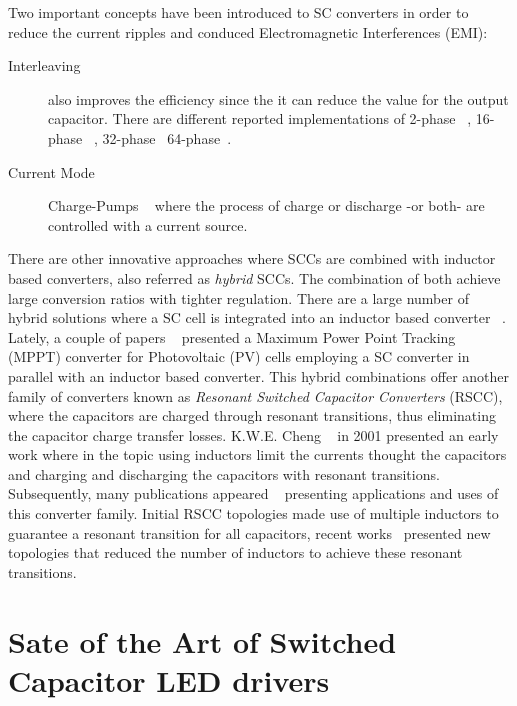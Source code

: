 Two important concepts have been introduced to SC converters in order to reduce the current ripples and conduced Electromagnetic Interferences (EMI):
\begin{description}
  \item[Interleaving] also improves the efficiency since the it can reduce the value for the output capacitor. There are different reported implementations of 2-phase ~\cite{07Chang,99Chung}, 16-phase ~\cite{09Breussegem,14Andersen}, 32-phase~\cite{10Le} 64-phase~\cite{15Andersen}.
  \item[Current Mode] Charge-Pumps ~\cite{96Zhu,09Das} where the process of charge or discharge -or both- are controlled with a current source.
\end{description}

There are other innovative approaches where SCCs are combined with inductor based converters, also referred as \emph{hybrid} SCCs. The combination of both achieve large conversion ratios with tighter regulation. There are a large number of hybrid solutions where a SC cell is integrated into an inductor based converter ~\cite{05Axelrod,08Axelrod, 11Mayo,11Miranda,12Kline}. Lately, a couple of papers ~\cite{12Zhigang,11Dazhong} presented a Maximum Power Point Tracking (MPPT) converter for Photovoltaic (PV) cells employing a SC converter in parallel with an inductor based converter. This hybrid combinations offer another family of converters known as \emph{Resonant Switched Capacitor Converters} (RSCC), where the capacitors are charged through resonant transitions, thus eliminating the capacitor charge transfer losses.  K.W.E. Cheng ~\cite{01Cheng} in 2001 presented an early  work where in the topic using inductors limit the currents thought the capacitors and charging and discharging the capacitors with resonant transitions.  Subsequently, many publications appeared ~\cite{05Lee,10Cao,11Gebben,07Shoyama} presenting applications and uses of this converter family. Initial RSCC topologies made use of multiple inductors to guarantee a resonant transition for all capacitors, recent works~\cite{13Kesarwani,13Schaef,14Kesarwani,15Schaef} presented new topologies that reduced the number of inductors to achieve these resonant transitions.


\section{Sate of the Art of Switched Capacitor LED drivers}





